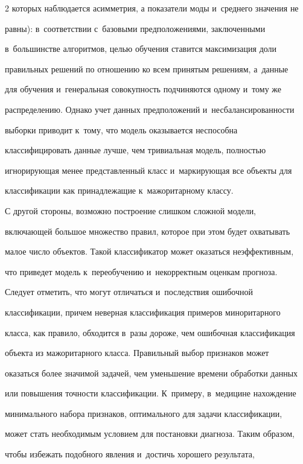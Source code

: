 \begin{multicols}{2}
которых наблюдается асимметрия, а показатели моды и~среднего значения не 

равны): в~соответствии с~базовыми предположениями, заключенными 

в~большинстве алгоритмов, целью обучения ставится максимизация доли 

правильных решений по отношению ко всем принятым решениям, а~данные 

для обучения и~генеральная совокупность подчиняются одному и~тому же 

распределению. Однако учет данных предположений и~несбалансированности 

выборки приводит к~тому, что модель оказывается неспособна 

классифицировать данные лучше, чем тривиальная модель, полностью 

игнорирующая менее представленный класс и~маркирующая все объекты для 

классификации как принадлежащие к~мажоритарному классу.

  

  С другой стороны, возможно построение слишком сложной модели, 

включающей большое мно\-же\-ство правил, которое при этом будет охватывать\linebreak 

малое число объектов. Такой классификатор может оказаться неэффективным, 

что приведет модель к~переобучению и~некорректным оценкам прогноза. 

Следует отметить, что могут отличаться и~последствия ошибочной 

классификации, причем неверная классификация примеров миноритарного 

класса, как правило, обходится в~разы дороже, чем ошибочная классификация 

объекта из мажоритарного класса. Правильный выбор признаков может 

оказаться более значимой задачей, чем уменьшение времени обработки данных 

или повышения точности классификации. К~примеру, в~медицине нахождение 

минимального набора признаков, оптимального для задачи классификации, 

может стать необходимым условием для постановки диагноза. Таким образом, 

чтобы избежать подобного явления и~достичь хорошего результата, 


\end{multicols}

